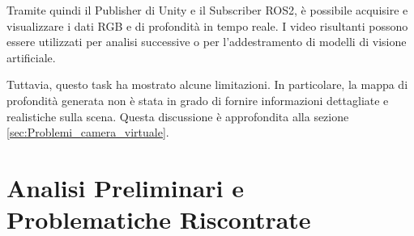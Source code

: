 \documentclass[11pt]{report}
\begin{document}
Tramite quindi il Publisher di Unity e il Subscriber ROS2, è possibile acquisire e visualizzare i dati RGB e di profondità in tempo reale. I video risultanti possono essere utilizzati per analisi successive o per l'addestramento di modelli di visione artificiale.


Tuttavia, questo task ha mostrato alcune limitazioni. In particolare, la mappa di profondità generata non è stata in grado di fornire informazioni dettagliate e realistiche sulla scena. Questa discussione è approfondita alla sezione \ref{sec:Problemi_camera_virtuale}.


\chapter{Analisi Preliminari e Problematiche Riscontrate}
\label{sec:Problemi}
\end{document}
